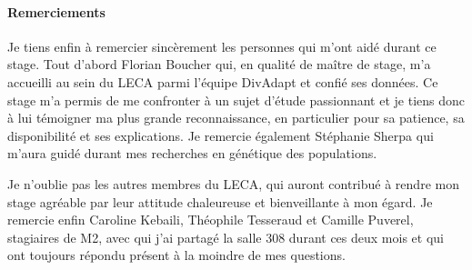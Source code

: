 \paragraph{Remerciements}
Je tiens enfin à remercier sincèrement les personnes qui m'ont aidé durant ce stage.
 Tout d'abord Florian Boucher qui, en qualité de maître de stage, m'a accueilli au sein du LECA parmi l'équipe DivAdapt et confié ses données.
 Ce stage m'a permis de me confronter à un sujet d'étude passionnant et je tiens donc à lui témoigner ma plus grande reconnaissance, en particulier pour sa patience, sa disponibilité et ses explications.
 Je remercie également Stéphanie Sherpa qui m'aura guidé durant mes recherches en génétique des populations.

Je n’oublie pas les autres membres du LECA, qui auront contribué à rendre mon stage agréable par leur attitude chaleureuse et bienveillante à mon égard.
 Je remercie enfin Caroline Kebaili, Théophile Tesseraud et Camille Puverel, stagiaires de M2, avec qui j’ai partagé la salle 308 durant ces deux mois et qui ont toujours répondu présent à la moindre de mes questions.